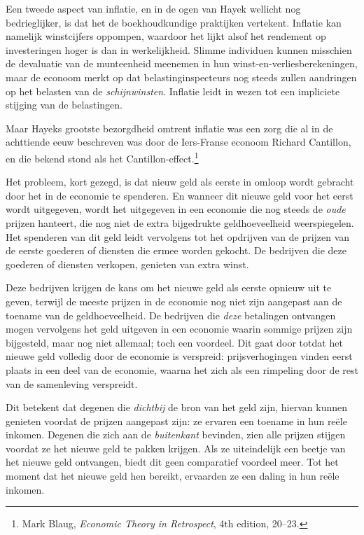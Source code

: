 \documentclass[
  a5paper,
  smalldemyvopaper,11pt,twoside,onecolumn,openright,extrafontsizes,
hidelinks]{memoir}
\begin{document}
Een tweede aspect van inflatie, en in de ogen van Hayek wellicht nog
bedrieglijker, is dat het de boekhoudkundige praktijken vertekent.
Inflatie kan namelijk winstcijfers oppompen, waardoor het lijkt alsof
het rendement op investeringen hoger is dan in werkelijkheid. Slimme
individuen kunnen misschien de devaluatie van de munteenheid meenemen in
hun winst-en-verliesberekeningen, maar de econoom merkt op dat
belastinginspecteurs nog steeds zullen aandringen op het belasten van de
\emph{schijnwinsten}. Inflatie leidt in wezen tot een impliciete
stijging van de belastingen.

Maar Hayeks grootste bezorgdheid omtrent inflatie was een zorg die al in
de achttiende eeuw beschreven was door de Iers-Franse econoom Richard
Cantillon, en die bekend stond als het Cantillon-effect.\footnote{\hspace{0pt}Mark
  Blaug, \emph{Economic Theory in Retrospect}, 4th edition, 20--23.}

Het probleem, kort gezegd, is dat nieuw geld als eerste in omloop wordt
gebracht door het in de economie te spenderen. En wanneer dit nieuwe
geld voor het eerst wordt uitgegeven, wordt het uitgegeven in een
economie die nog steeds de \emph{oude} prijzen hanteert, die nog niet de
extra bijgedrukte geldhoeveelheid weerspiegelen. Het spenderen van dit
geld leidt vervolgens tot het opdrijven van de prijzen van de eerste
goederen of diensten die ermee worden gekocht. De bedrijven die deze
goederen of diensten verkopen, genieten van extra winst.

Deze bedrijven krijgen de kans om het nieuwe geld als eerste opnieuw uit
te geven, terwijl de meeste prijzen in de economie nog niet zijn
aangepast aan de toename van de geldhoeveelheid. De bedrijven die
\emph{deze} betalingen ontvangen mogen vervolgens het geld uitgeven in
een economie waarin sommige prijzen zijn bijgesteld, maar nog niet
allemaal; toch een voordeel. Dit gaat door totdat het nieuwe geld
volledig door de economie is verspreid: prijsverhogingen vinden eerst
plaats in een deel van de economie, waarna het zich als een rimpeling
door de rest van de samenleving verspreidt.

Dit betekent dat degenen die \emph{dichtbij} de bron van het geld zijn,
hiervan kunnen genieten voordat de prijzen aangepast zijn: ze ervaren
een toename in hun reële inkomen. Degenen die zich aan de
\emph{buitenkant} bevinden, zien alle prijzen stijgen voordat ze het
nieuwe geld te pakken krijgen. Als ze uiteindelijk een beetje van het
nieuwe geld ontvangen, biedt dit geen comparatief voordeel meer. Tot het
moment dat het nieuwe geld hen bereikt, ervaarden ze een daling in hun
reële inkomen.
\end{document}
